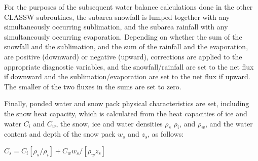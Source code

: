 For the purposes of the subsequent water balance calculations done in the other C\+L\+A\+S\+S\+W subroutines, the subarea snowfall is lumped together with any simultaneously occurring sublimation, and the subarea rainfall with any simultaneously occurring evaporation. Depending on whether the sum of the snowfall and the sublimation, and the sum of the rainfall and the evaporation, are positive (downward) or negative (upward), corrections are applied to the appropriate diagnostic variables, and the snowfall/rainfall are set to the net flux if downward and the sublimation/evaporation are set to the net flux if upward. The smaller of the two fluxes in the sums are set to zero.

Finally, ponded water and snow pack physical characteristics are set, including the snow heat capacity, which is calculated from the heat capacities of ice and water $C_i$ and $C_w$, the snow, ice and water densities $\rho_s$ $\rho_i$, and $\rho_w$, and the water content and depth of the snow pack $w_s$ and $z_s$, as follows\+:

$C_s = C_i [\rho_s /\rho_i] + C_w w_s /[\rho_w z_s]$
